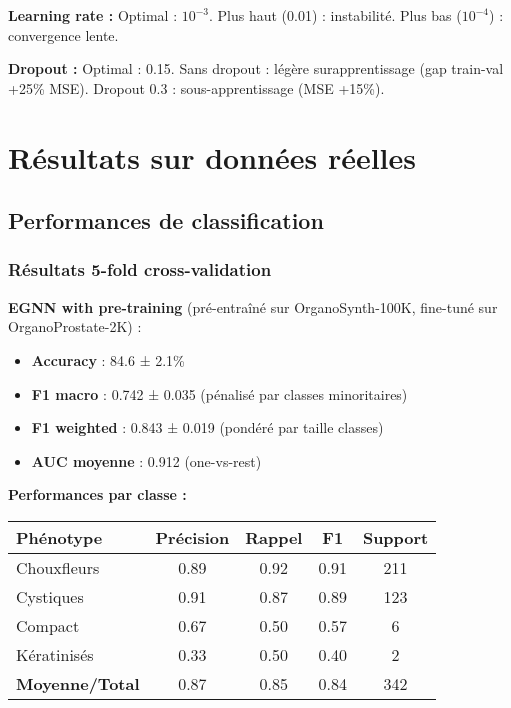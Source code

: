 \textbf{Learning rate :}
Optimal : $10^{-3}$. Plus haut (0.01) : instabilité. Plus bas ($10^{-4}$) : convergence lente.

\textbf{Dropout :}
Optimal : 0.15. Sans dropout : légère surapprentissage (gap train-val +25\% MSE). Dropout 0.3 : sous-apprentissage (MSE +15\%).

\section{Résultats sur données réelles}

\subsection{Performances de classification}

\subsubsection{Résultats 5-fold cross-validation}

\textbf{EGNN with pre-training} (pré-entraîné sur OrganoSynth-100K, fine-tuné sur OrganoProstate-2K) :
\begin{itemize}
    \item \textbf{Accuracy} : 84.6 ± 2.1\%
    \item \textbf{F1 macro} : 0.742 ± 0.035 (pénalisé par classes minoritaires)
    \item \textbf{F1 weighted} : 0.843 ± 0.019 (pondéré par taille classes)
    \item \textbf{AUC moyenne} : 0.912 (one-vs-rest)
\end{itemize}

\textbf{Performances par classe :}
\begin{center}
\begin{tabular}{|l|c|c|c|c|}
\hline
\textbf{Phénotype} & \textbf{Précision} & \textbf{Rappel} & \textbf{F1} & \textbf{Support} \\
\hline
Chouxfleurs & 0.89 & 0.92 & 0.91 & 211 \\
Cystiques & 0.91 & 0.87 & 0.89 & 123 \\
Compact & 0.67 & 0.50 & 0.57 & 6 \\
Kératinisés & 0.33 & 0.50 & 0.40 & 2 \\
\hline
\textbf{Moyenne/Total} & 0.87 & 0.85 & 0.84 & 342 \\
\hline
\end{tabular}
\end{center}

